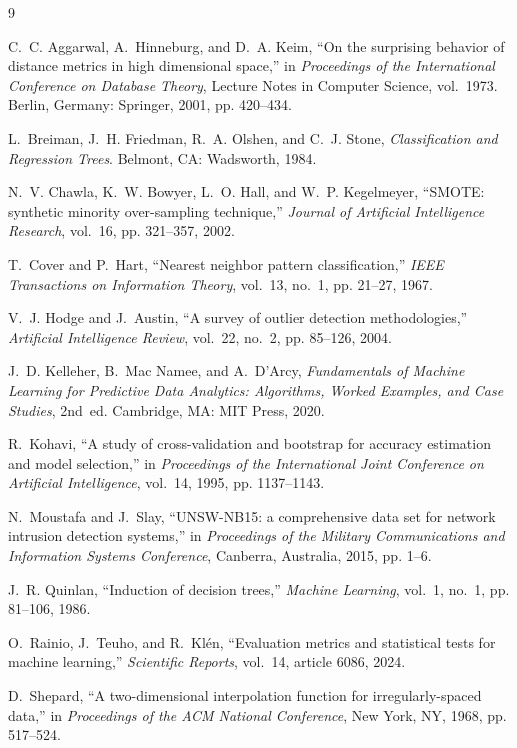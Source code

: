 \documentclass[10pt,conference]{IEEEtran}
\begin{document}
\begin{thebibliography}{9}

C.~C. Aggarwal, A.~Hinneburg, and D.~A. Keim, ``On the surprising behavior of distance metrics in high dimensional space,'' in \emph{Proceedings of the International Conference on Database Theory}, Lecture Notes in Computer Science, vol.~1973. Berlin, Germany: Springer, 2001, pp. 420--434.

L.~Breiman, J.~H. Friedman, R.~A. Olshen, and C.~J. Stone, \emph{Classification and Regression Trees}. Belmont, CA: Wadsworth, 1984.

N.~V. Chawla, K.~W. Bowyer, L.~O. Hall, and W.~P. Kegelmeyer, ``SMOTE: synthetic minority over-sampling technique,'' \emph{Journal of Artificial Intelligence Research}, vol.~16, pp. 321--357, 2002.

T.~Cover and P.~Hart, ``Nearest neighbor pattern classification,'' \emph{IEEE Transactions on Information Theory}, vol.~13, no.~1, pp. 21--27, 1967.

V.~J. Hodge and J.~Austin, ``A survey of outlier detection methodologies,'' \emph{Artificial Intelligence Review}, vol.~22, no.~2, pp. 85--126, 2004.

J.~D. Kelleher, B.~Mac Namee, and A.~D'Arcy, \emph{Fundamentals of Machine Learning for Predictive Data Analytics: Algorithms, Worked Examples, and Case Studies}, 2nd~ed. Cambridge, MA: MIT Press, 2020.

R.~Kohavi, ``A study of cross-validation and bootstrap for accuracy estimation and model selection,'' in \emph{Proceedings of the International Joint Conference on Artificial Intelligence}, vol.~14, 1995, pp. 1137--1143.

N.~Moustafa and J.~Slay, ``UNSW-NB15: a comprehensive data set for network intrusion detection systems,'' in \emph{Proceedings of the Military Communications and Information Systems Conference}, Canberra, Australia, 2015, pp. 1--6.

J.~R. Quinlan, ``Induction of decision trees,'' \emph{Machine Learning}, vol.~1, no.~1, pp. 81--106, 1986.

O.~Rainio, J.~Teuho, and R.~Klén, ``Evaluation metrics and statistical tests for machine learning,'' \emph{Scientific Reports}, vol.~14, article 6086, 2024.

D.~Shepard, ``A two-dimensional interpolation function for irregularly-spaced data,'' in \emph{Proceedings of the ACM National Conference}, New York, NY, 1968, pp. 517--524.

\end{thebibliography}
\end{document}
